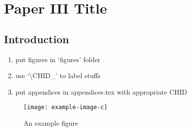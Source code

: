 \chapter{Paper III Title}\label{ch:\CHID}

	

\section{Introduction} \label{\CHID_sec:intro}
	\begin{enumerate}
		\item put figures in `figures' folder
		\item use `\textbackslash CHID\_' to label stuffs
		\item put appendices in appendices.tex with appropriate CHID
	\end{enumerate}
	\begin{figure}[h]
		\centering
		\texttt{[image: example-image-c]}
		\caption{An example figure}\label{\CHID_fig:exmple_image}
	\end{figure}